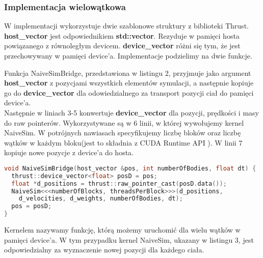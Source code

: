 \documentclass[14pt,twoside,a4paper]{article}
\theoremstyle{definition}
\begin{document}
\subsubsection{\large Implementacja wielowątkowa}
W implementacji wykorzystuje dwie szablonowe struktury z biblioteki Thrust.
\textbf{host\_vector}\cite{thrust} jest odpowiednikiem \textbf{std::vector}. Rezyduje w pamięci hosta powiązanego z równoległym devicem. \textbf{device\_vector}\cite{thrust} różni się tym, że jest przechowywany w pamięci device'a. Implementacje podzielimy na dwie funkcje.\\
\bigskip

Funkcja NaiveSimBridge, przedstawiona w listingu 2, przyjmuje jako argument \textbf{host\_vector} z pozycjami wszystkich elementów symulacji, a następnie kopiuje go do \textbf{device\_vector} dla odowiedzialnego za transport pozycji ciał do pamięci device'a. \\Następnie w liniach 3-5 konwertuje \textbf{device\_vector} dla pozycji, prędkości i masy do raw pointerów. Wykorzystywane są w 6 linii, w której wywołujemy kernel NaiveSim. W potrójnych nawiasach specyfikujemy liczbę bloków oraz liczbę wątków w każdym bloku(jest to składnia z CUDA Runtime API \cite{runtimeApi}). 
W linii 7 kopiuje nowe pozycje z device'a do hosta. 
\bigskip
\bigskip
\bigskip

\begin{lstlisting}[language=C++, frame=single, framerule=2pt, caption=Bridge pomiędzy główną pętlą a kernelem]
void NaiveSimBridge(host_vector &pos, int numberOfBodies, float dt) {
  thrust::device_vector<float> posD = pos;
  float *d_positions = thrust::raw_pointer_cast(posD.data());
  NaiveSim<<<numberOfBlocks, threadsPerBlock>>>(d_positions, 
  	d_velocities, d_weights, numberOfBodies, dt);
  pos = posD;
}
\end{lstlisting}

\bigskip
\bigskip
Kernelem nazywamy funkcję, którą możemy uruchomić dla wielu wątków w pamięci device'a. W tym przypadku kernel NaiveSim, ukazany w listingu 3, jest odpowiedzialny za wyznaczenie nowej pozycji dla każdego ciała. \\
\bigskip
\end{document}
